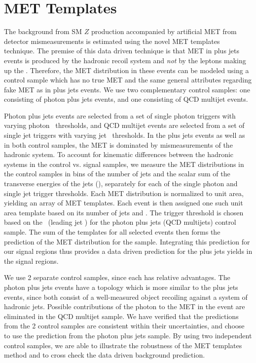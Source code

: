 \section{MET Templates}
\label{sec:templates}

The background from SM $Z$ production accompanied by artificial MET from detector mismeasurements
is estimated using the novel MET templates technique.
The premise of this data driven technique is that MET in \Z plus jets events
is produced by the hadronic recoil system and {\it not} by the leptons making up the \Z.
Therefore, the MET distribution in these events can be modeled using a control sample
which has no true MET and the same general attributes regarding fake MET as in \Z plus jets events.
We use two complementary control samples: one consisting of photon plus jets events, and one
consisting of QCD multijet events. 

Photon plus jets events are selected from a set of single photon
triggers with varying photon \pt\ thresholds, and QCD multijet events are selected from a set
of single jet triggers with varying jet \pt\ thresholds. 
In the \Z plus jets events as well as in both control samples, the MET is dominated by mismeasurements
of the hadronic system. To account for kinematic 
differences between the hadronic systems in the control vs. signal samples, 
we measure the MET distributions in the control samples in bins of the number of jets and the 
scalar sum of the transverse energies of the jets (\Ht), separately for each of the single photon and single jet trigger thresholds.
Each MET distribution is normalized to unit area, yielding an
array of MET templates. Each \Z event is then assigned one such unit area template based on its number of jets and \Ht.
The trigger threshold is chosen based on the \Z \pt\ (leading jet \pt) for the photon plus
jets (QCD multijets) control sample.
The sum of the templates for all selected \Z events then forms the 
prediction of the MET distribution for the \Z sample. Integrating this prediction for our 
signal regions  thus provides a data driven prediction for the \Z plus jets yields in the 
signal regions. 

We use 2 separate control samples, since each has relative advantages. The photon plus jets events have a topology
which is more similar to the \Z plus jets events, since both consist of a well-measured
object recoiling against a system of hadronic jets. Possible contributions of the photon
to the MET in the event are eliminated in the QCD multijet sample. We have verified that
the predictions from the 2 control samples are consistent within their uncertainties, and
choose to use the prediction from the photon plus jets sample.
By using two independent control samples, we are able to illustrate
the robustness of the MET templates method and to cross check the data driven background 
prediction.

